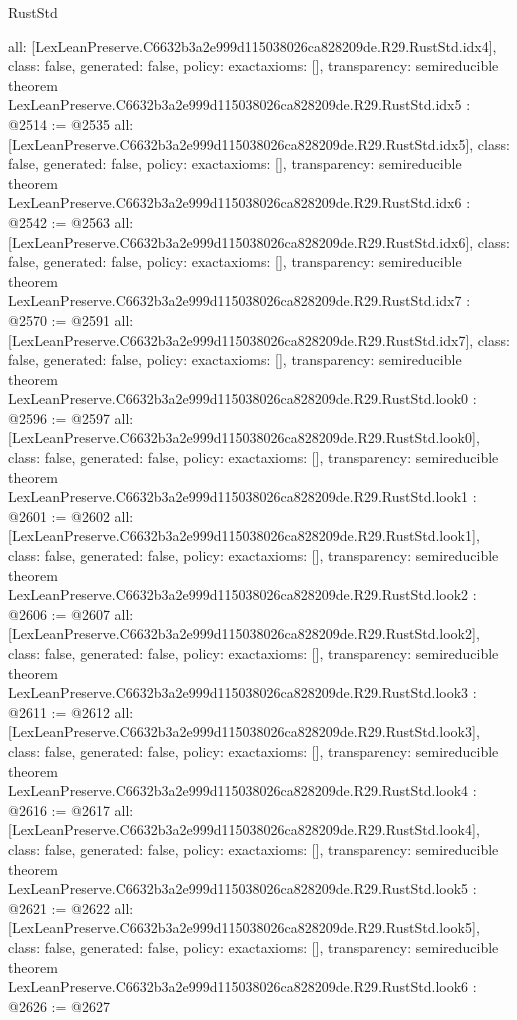 \begin{lexlean}{RustStd}
\begin{coremodule}
{  all: [LexLeanPreserve.C6632b3a2e999d115038026ca828209de.R29.RustStd.idx4],
  class: false,
  generated: false,
  policy: exact{axioms: []},
  transparency: semireducible
}
theorem LexLeanPreserve.C6632b3a2e999d115038026ca828209de.R29.RustStd.idx5 : @2514 := @2535 {
  all: [LexLeanPreserve.C6632b3a2e999d115038026ca828209de.R29.RustStd.idx5],
  class: false,
  generated: false,
  policy: exact{axioms: []},
  transparency: semireducible
}
theorem LexLeanPreserve.C6632b3a2e999d115038026ca828209de.R29.RustStd.idx6 : @2542 := @2563 {
  all: [LexLeanPreserve.C6632b3a2e999d115038026ca828209de.R29.RustStd.idx6],
  class: false,
  generated: false,
  policy: exact{axioms: []},
  transparency: semireducible
}
theorem LexLeanPreserve.C6632b3a2e999d115038026ca828209de.R29.RustStd.idx7 : @2570 := @2591 {
  all: [LexLeanPreserve.C6632b3a2e999d115038026ca828209de.R29.RustStd.idx7],
  class: false,
  generated: false,
  policy: exact{axioms: []},
  transparency: semireducible
}
theorem LexLeanPreserve.C6632b3a2e999d115038026ca828209de.R29.RustStd.look0 : @2596 := @2597 {
  all: [LexLeanPreserve.C6632b3a2e999d115038026ca828209de.R29.RustStd.look0],
  class: false,
  generated: false,
  policy: exact{axioms: []},
  transparency: semireducible
}
theorem LexLeanPreserve.C6632b3a2e999d115038026ca828209de.R29.RustStd.look1 : @2601 := @2602 {
  all: [LexLeanPreserve.C6632b3a2e999d115038026ca828209de.R29.RustStd.look1],
  class: false,
  generated: false,
  policy: exact{axioms: []},
  transparency: semireducible
}
theorem LexLeanPreserve.C6632b3a2e999d115038026ca828209de.R29.RustStd.look2 : @2606 := @2607 {
  all: [LexLeanPreserve.C6632b3a2e999d115038026ca828209de.R29.RustStd.look2],
  class: false,
  generated: false,
  policy: exact{axioms: []},
  transparency: semireducible
}
theorem LexLeanPreserve.C6632b3a2e999d115038026ca828209de.R29.RustStd.look3 : @2611 := @2612 {
  all: [LexLeanPreserve.C6632b3a2e999d115038026ca828209de.R29.RustStd.look3],
  class: false,
  generated: false,
  policy: exact{axioms: []},
  transparency: semireducible
}
theorem LexLeanPreserve.C6632b3a2e999d115038026ca828209de.R29.RustStd.look4 : @2616 := @2617 {
  all: [LexLeanPreserve.C6632b3a2e999d115038026ca828209de.R29.RustStd.look4],
  class: false,
  generated: false,
  policy: exact{axioms: []},
  transparency: semireducible
}
theorem LexLeanPreserve.C6632b3a2e999d115038026ca828209de.R29.RustStd.look5 : @2621 := @2622 {
  all: [LexLeanPreserve.C6632b3a2e999d115038026ca828209de.R29.RustStd.look5],
  class: false,
  generated: false,
  policy: exact{axioms: []},
  transparency: semireducible
}
theorem LexLeanPreserve.C6632b3a2e999d115038026ca828209de.R29.RustStd.look6 : @2626 := @2627 {
}
\end{coremodule}
\end{lexlean}
